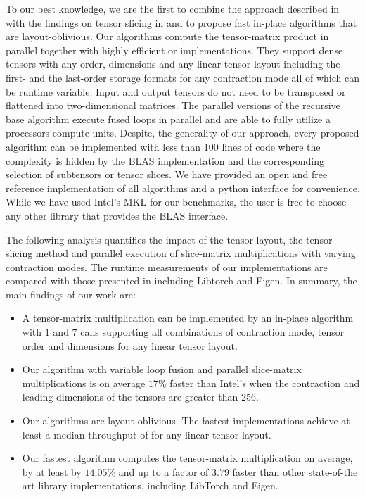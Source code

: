 To our best knowledge, we are the first to combine the approach described in \cite{bassoy:2019:ttv} with the findings on tensor slicing in \cite{li:2015:input} and to propose fast in-place algorithms that are layout-oblivious.
Our algorithms compute the tensor-matrix product in parallel together with highly efficient  or  implementations.
They support dense tensors with any order, dimensions and any linear tensor layout including the first- and the last-order storage formats for any contraction mode all of which can be runtime variable.
Input and output tensors do not need to be transposed or flattened into two-dimensional matrices.
The parallel versions of the recursive base algorithm execute fused loops in parallel and are able to fully utilize a processors compute units.
Despite, the generality of our approach, every proposed algorithm can be implemented with less than 100 lines of  code where the complexity is hidden by the BLAS implementation and the corresponding selection of subtensors or tensor slices.
We have provided an open and free reference  implementation of all algorithms and a python interface for convenience.
While we have used Intel's MKL for our benchmarks, the user is free to choose any other library that provides the BLAS interface.

The following analysis quantifies the impact of the tensor layout, the tensor slicing method and parallel execution of slice-matrix multiplications with varying contraction modes.
The runtime measurements of our implementations are compared with those presented in \cite{springer:2018:design, matthews:2018:high} including Libtorch and Eigen.
In summary, the main findings of our work are:
\begin{itemize}
	\item 
	A tensor-matrix multiplication can be implemented by an in-place algorithm with $1$  and $7$  calls supporting all combinations of contraction mode, tensor order and dimensions for any linear tensor layout.
	\item 
	Our algorithm with variable loop fusion and parallel slice-matrix multiplications is on average $17$\% faster than Intel's  when the contraction and leading dimensions of the tensors are greater than $256$.
	\item 
	Our algorithms are layout oblivious.
	The fastest implementations achieve at least a median throughput of \tq for any linear tensor layout.
	\item
	Our fastest algorithm computes the tensor-matrix multiplication on average, by at least by $14.05$\% and up to a factor of $3.79$ faster than other state-of-the art library implementations, including LibTorch and Eigen.
\end{itemize}


